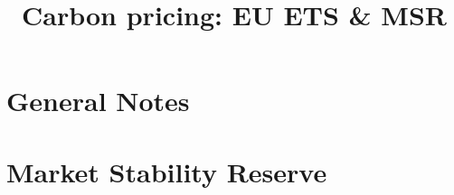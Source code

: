 \documentclass{article}
\title{Carbon pricing: EU ETS \& MSR}
\begin{document}
	
	\maketitle
	
	\section{General Notes}
	
			
	
	
	\section{Market Stability Reserve}
		
	
	 
	
\end{document}
